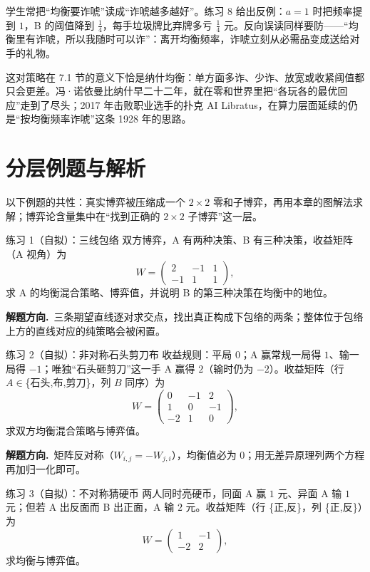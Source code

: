 \documentclass[UTF8,a4paper,11pt,oneside,openany,fontset=fandol]{ctexbook}
\theoremstyle{definition}
\newcommand{\hint}{\par\noindent\textbf{解题方向.}\ }
\begin{document}
\begin{pitfall}[诈唬不是越多越好]
学生常把“均衡要诈唬”读成“诈唬越多越好”。练习 8 给出反例：$a=1$ 时把频率提到 $1$，B 的阈值降到 $\tfrac14$，每手垃圾牌比弃牌多亏 $\tfrac14$ 元。反向误读同样要防——“均衡里有诈唬，所以我随时可以诈”：离开均衡频率，诈唬立刻从必需品变成送给对手的礼物。
\end{pitfall}

这对策略在 7.1 节的意义下恰是纳什均衡：单方面多诈、少诈、放宽或收紧阈值都只会更差。冯·诺依曼比纳什早二十二年，就在零和世界里把“各玩各的最优回应”走到了尽头；2017 年击败职业选手的扑克 AI Libratus，在算力层面延续的仍是“按均衡频率诈唬”这条 1928 年的思路。

\section{分层例题与解析}

以下例题的共性：真实博弈被压缩成一个 $2\times2$ 零和子博弈，再用本章的图解法求解；博弈论含量集中在“找到正确的 $2\times2$ 子博弈”这一层。


\begin{problem}{练习 1（自拟）：三线包络}
双方博弈，A 有两种决策、B 有三种决策，收益矩阵（A 视角）为
\[
 W=\begin{pmatrix}2&-1&1\\-1&1&1\end{pmatrix},
\]
求 A 的均衡混合策略、博弈值，并说明 B 的第三种决策在均衡中的地位。
\end{problem}

\hint 三条期望直线逐对求交点，找出真正构成下包络的两条；整体位于包络上方的直线对应的纯策略会被闲置。

\begin{problem}{练习 2（自拟）：非对称石头剪刀布}
收益规则：平局 $0$；A 赢常规一局得 $1$、输一局得 $-1$；唯独“石头砸剪刀”这一手 A 赢得 $2$（输时仍为 $-2$）。收益矩阵（行 $A\in$\{石头,布,剪刀\}，列 $B$ 同序）为
\[
 W=\begin{pmatrix}0&-1&2\\1&0&-1\\-2&1&0\end{pmatrix},
\]
求双方均衡混合策略与博弈值。
\end{problem}

\hint 矩阵反对称（$W_{i,j}=-W_{j,i}$），均衡值必为 $0$；用无差异原理列两个方程再加归一化即可。

\begin{problem}{练习 3（自拟）：不对称猜硬币}
两人同时亮硬币，同面 A 赢 $1$ 元、异面 A 输 $1$ 元；但若 A 出反面而 B 出正面，A 输 $2$ 元。收益矩阵（行 \{正,反\}，列 \{正,反\}）为
\[
 W=\begin{pmatrix}1&-1\\-2&2\end{pmatrix},
\]
求均衡与博弈值。
\end{problem}
\end{document}
